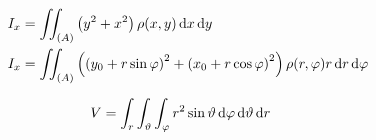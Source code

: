 \begin{boxleft}
\end{boxleft}\begin{boxrightshaded}
\begin{align*}
I_x&=\iint_{(A)}\left(y^2+x^2\right)\rho(x,y)\mathop{}\!\mathrm{d} x\mathop{}\!\mathrm{d} y\\
I_x&=\iint_{(A)}\left(\left(y_0+r\sin\varphi\right)^2+\left(x_0+r\cos\varphi\right)^2\right)\rho(r,\varphi)r\mathop{}\!\mathrm{d} r\mathop{}\!\mathrm{d} \varphi
\end{align*}
\end{boxrightshaded}

\begin{boxleft}
\end{boxleft}\begin{boxrightshaded}
\begin{align*}
V&=\int_r\int_\vartheta\int_\varphi r^2\sin\vartheta\mathop{}\!\mathrm{d} \varphi \mathop{}\!\mathrm{d} \vartheta \mathop{}\!\mathrm{d} r
\end{align*}
\end{boxrightshaded}

